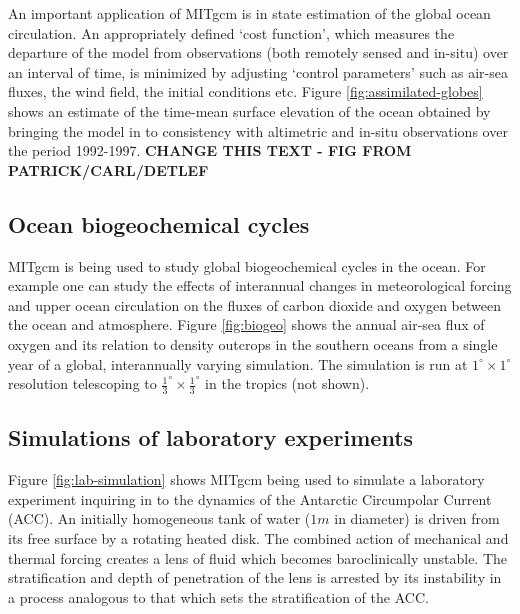 An important application of MITgcm is in state estimation of the global
ocean circulation. An appropriately defined `cost function', which measures
the departure of the model from observations (both remotely sensed and
in-situ) over an interval of time, is minimized by adjusting `control
parameters' such as air-sea fluxes, the wind field, the initial conditions
etc. Figure \ref{fig:assimilated-globes} shows an estimate of the time-mean
surface elevation of the ocean obtained by bringing the model in to
consistency with altimetric and in-situ observations over the period
1992-1997. {\bf CHANGE THIS TEXT - FIG FROM PATRICK/CARL/DETLEF}



\subsection{Ocean biogeochemical cycles}

MITgcm is being used to study global biogeochemical cycles in the ocean. For
example one can study the effects of interannual changes in meteorological
forcing and upper ocean circulation on the fluxes of carbon dioxide and
oxygen between the ocean and atmosphere. Figure \ref{fig:biogeo} shows 
the annual air-sea flux of oxygen and its relation to density outcrops in 
the southern oceans from a single year of a global, interannually varying 
simulation. The simulation is run at $1^{\circ}\times1^{\circ}$ resolution
telescoping to $\frac{1}{3}^{\circ}\times\frac{1}{3}^{\circ}$ in the tropics (not shown).



\subsection{Simulations of laboratory experiments}

Figure \ref{fig:lab-simulation} shows MITgcm being used to simulate a 
laboratory experiment inquiring in to the dynamics of the Antarctic Circumpolar Current (ACC). An
initially homogeneous tank of water ($1m$ in diameter) is driven from its
free surface by a rotating heated disk. The combined action of mechanical
and thermal forcing creates a lens of fluid which becomes baroclinically
unstable. The stratification and depth of penetration of the lens is
arrested by its instability in a process analogous to that which sets the
stratification of the ACC.

